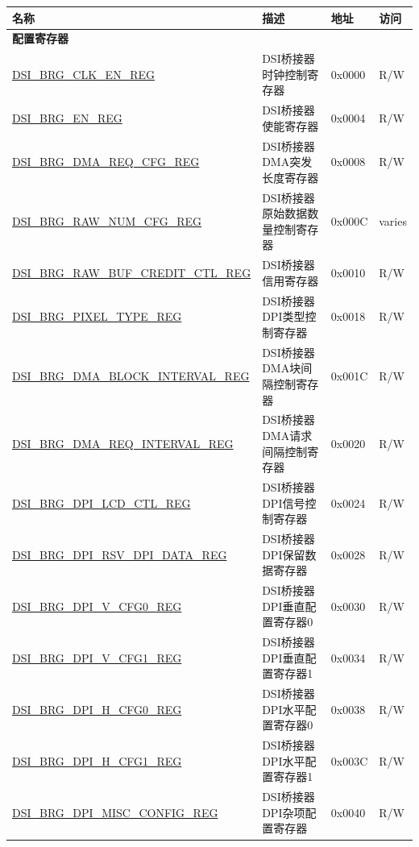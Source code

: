 \begin{longtable}{ | p{6.8cm} | p{6.5cm} | p{1.2cm} | p{1cm} | }
\hline\rowcolor{lightgray}
名称 & 描述 & 地址 & 访问 \\ \hline
\endhead
\multicolumn{4}{|l|}{\textbf{配置寄存器}} \\ \hline
\hyperref[regdesc:DSIBRGCLKENREG]{DSI\_BRG\_CLK\_EN\_REG} & DSI桥接器时钟控制寄存器 & 0x0000 & R/W \\ \hline
\hyperref[regdesc:DSIBRGENREG]{DSI\_BRG\_EN\_REG} & DSI桥接器使能寄存器 & 0x0004 & R/W \\ \hline
\hyperref[regdesc:DSIBRGDMAREQCFGREG]{DSI\_BRG\_DMA\_REQ\_CFG\_REG} & DSI桥接器DMA突发长度寄存器 & 0x0008 & R/W \\ \hline
\hyperref[regdesc:DSIBRGRAWNUMCFGREG]{DSI\_BRG\_RAW\_NUM\_CFG\_REG} & DSI桥接器原始数据数量控制寄存器 & 0x000C & varies \\ \hline
\hyperref[regdesc:DSIBRGRAWBUFCREDITCTLREG]{DSI\_BRG\_RAW\_BUF\_CREDIT\_CTL\_REG} & DSI桥接器信用寄存器 & 0x0010 & R/W \\ \hline
\hyperref[regdesc:DSIBRGPIXELTYPEREG]{DSI\_BRG\_PIXEL\_TYPE\_REG} & DSI桥接器DPI类型控制寄存器 & 0x0018 & R/W \\ \hline
\hyperref[regdesc:DSIBRGDMABLOCKINTERVALREG]{DSI\_BRG\_DMA\_BLOCK\_INTERVAL\_REG} & DSI桥接器DMA块间隔控制寄存器 & 0x001C & R/W \\ \hline
\hyperref[regdesc:DSIBRGDMAREQINTERVALREG]{DSI\_BRG\_DMA\_REQ\_INTERVAL\_REG} & DSI桥接器DMA请求间隔控制寄存器 & 0x0020 & R/W \\ \hline
\hyperref[regdesc:DSIBRGDPILCDCTLREG]{DSI\_BRG\_DPI\_LCD\_CTL\_REG} & DSI桥接器DPI信号控制寄存器 & 0x0024 & R/W \\ \hline
\hyperref[regdesc:DSIBRGDPIRSVDPIDATAREG]{DSI\_BRG\_DPI\_RSV\_DPI\_DATA\_REG} & DSI桥接器DPI保留数据寄存器 & 0x0028 & R/W \\ \hline
\hyperref[regdesc:DSIBRGDPIVCFG0REG]{DSI\_BRG\_DPI\_V\_CFG0\_REG} & DSI桥接器DPI垂直配置寄存器0 & 0x0030 & R/W \\ \hline
\hyperref[regdesc:DSIBRGDPIVCFG1REG]{DSI\_BRG\_DPI\_V\_CFG1\_REG} & DSI桥接器DPI垂直配置寄存器1 & 0x0034 & R/W \\ \hline
\hyperref[regdesc:DSIBRGDPIHCFG0REG]{DSI\_BRG\_DPI\_H\_CFG0\_REG} & DSI桥接器DPI水平配置寄存器0 & 0x0038 & R/W \\ \hline
\hyperref[regdesc:DSIBRGDPIHCFG1REG]{DSI\_BRG\_DPI\_H\_CFG1\_REG} & DSI桥接器DPI水平配置寄存器1 & 0x003C & R/W \\ \hline
\hyperref[regdesc:DSIBRGDPIMISCCONFIGREG]{DSI\_BRG\_DPI\_MISC\_CONFIG\_REG} & DSI桥接器DPI杂项配置寄存器 & 0x0040 & R/W \\ \hline

\end{longtable}
